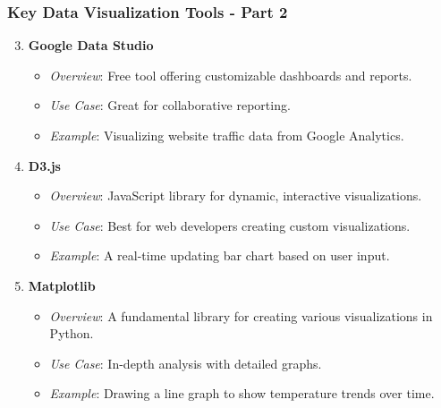 \documentclass[aspectratio=169]{beamer}
\begin{document}
\begin{frame}[fragile]
    \frametitle{Key Data Visualization Tools - Part 2}
    \begin{enumerate}
        \setcounter{enumi}{2}
        \item \textbf{Google Data Studio}
        \begin{itemize}
            \item \textit{Overview}: Free tool offering customizable dashboards and reports.
            \item \textit{Use Case}: Great for collaborative reporting.
            \item \textit{Example}: Visualizing website traffic data from Google Analytics.
        \end{itemize}

        \item \textbf{D3.js}
        \begin{itemize}
            \item \textit{Overview}: JavaScript library for dynamic, interactive visualizations.
            \item \textit{Use Case}: Best for web developers creating custom visualizations.
            \item \textit{Example}: A real-time updating bar chart based on user input.
        \end{itemize}

        \item \textbf{Matplotlib}
        \begin{itemize}
            \item \textit{Overview}: A fundamental library for creating various visualizations in Python.
            \item \textit{Use Case}: In-depth analysis with detailed graphs.
            \item \textit{Example}: Drawing a line graph to show temperature trends over time.
        \end{itemize}
    \end{enumerate}
\end{frame}
\end{document}
